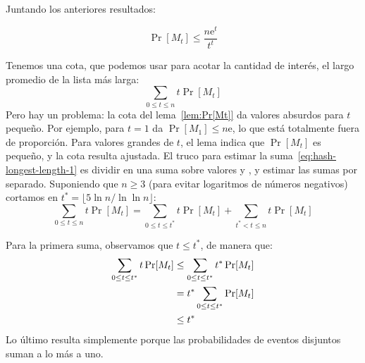   Juntando los anteriores resultados:
  \begin{lemma}
    \label{lem:Pr[Mt]}
    \begin{equation*}
      \Pr[ M_t ]
        \le \frac{n \mathrm{e}^t}{t^t}
    \end{equation*}
  \end{lemma}
  Tenemos una cota,
  que podemos usar para acotar la cantidad de interés,
  el largo promedio de la lista más larga:
  \begin{equation}
    \label{eq:hash-longest-length-1}
    \sum_{0 \le t \le n} t \Pr[M_t]
  \end{equation}
  Pero hay un problema:
  la cota del lema~\ref{lem:Pr[Mt]}
  da valores absurdos para \(t\) pequeño.
  Por ejemplo,
  para \(t = 1\) da \(\Pr[M_1] \le n \mathrm{e}\),
  lo que está totalmente fuera de proporción.
  Para valores grandes de \(t\),
  el lema indica que \(\Pr[M_t]\) es pequeño,
  y la cota resulta ajustada.
  El truco para estimar la suma~\eqref{eq:hash-longest-length-1}
  es dividir en una suma sobre valores  y ,
  y estimar las sumas por separado.
  Suponiendo que \(n \ge 3\)
  (para evitar logaritmos de números negativos)
  cortamos en \(t^* = \lfloor 5 \ln n / \ln \ln n \rfloor\):
  \begin{equation}
    \label{eq:hash-longest-length-cut}
    \sum_{0 \le t \le n} t \Pr[M_t]
      = \sum_{0 \le t \le t^*} t \Pr[M_t]
          + \sum_{t^* < t \le n} t \Pr[M_t]
  \end{equation}

  Para la primera suma,
  observamos que \(t \le t^*\),
  de manera que:
  \begin{align}
    \sum_{0 \le t \le t^*} t \Pr[M_t]
      &\le \sum_{0 \le t \le t^*} t^* \Pr[M_t] \notag \\
      &=   t^* \sum_{0 \le t \le t^*} \Pr[M_t] \notag \\
      &\le t^*
           \label{eq:hash-longest-length-small}
  \end{align}
  Lo último resulta simplemente porque las probabilidades de eventos disjuntos
  suman a lo más a uno.

